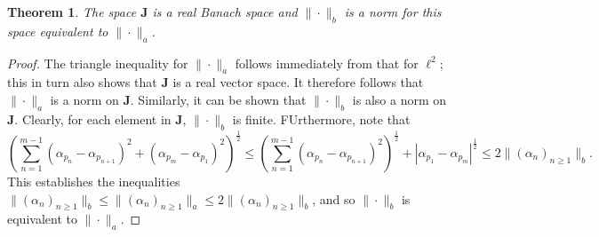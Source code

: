 \documentclass[11pt]{article}
\theoremstyle{thmstyle}
\newtheorem{theorem}{Theorem}[section]
\theoremstyle{defstyle}
\renewcommand{\le}{\leqslant}
\renewcommand{\ge}{\geqslant}
\newcommand{\bfJ}{\mathbf{J}}
\begin{document}
\begin{theorem}
	The space $\bfJ$ is a real Banach space and $\|\cdot\|_b$ is a norm for this space equivalent to $\|\cdot\|_a$.
\end{theorem}
\begin{proof}
	The triangle inequality for $\|\cdot\|_a$ follows immediately from that for $\ell^2$; this in turn also shows that $\bfJ$ is a real vector space. It therefore follows that $\|\cdot\|_a$ is a norm on $\bfJ$. Similarly, it can be shown that $\|\cdot\|_b$ is also a norm on $\bfJ$. Clearly, for each element in $\bfJ$, $\|\cdot\|_b$ is finite. FUrthermore, note that 
	\begin{equation*}
		\left(\sum_{n = 1}^{m - 1}(\alpha_{p_n} - \alpha_{p_{n + 1}})^2 + (\alpha_{p_m} - \alpha_{p_1})^2\right)^{\frac{1}{2}}\le \left(\sum_{n = 1}^{m - 1}(\alpha_{p_n} - \alpha_{p_{n + 1}})^2\right)^{\frac{1}{2}} + |\alpha_{p_1} - \alpha_{p_m}|^{\frac{1}{2}}\le 2\|(\alpha_n)_{n\ge 1}\|_b.
	\end{equation*}
	This establishes the inequalities $\|(\alpha_n)_{n\ge 1}\|_b\le \|(\alpha_n)_{n\ge 1}\|_a\le 2\|(\alpha_n)_{n\ge 1}\|_b$, and so $\|\cdot\|_b$ is equivalent to $\|\cdot\|_a$.


\end{proof}
\end{document}
